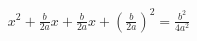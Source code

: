 \documentclass[preview]{standalone}
\begin{document}
\begin{align*}
{x}^{2} + \frac{b}{2 a} x + \frac{b}{2 a} x + {\left( \frac{b}{2 a} \right)}^{2} = \frac{{b}^{2}}{4 {a}^{2}}
\end{align*}
\end{document}

